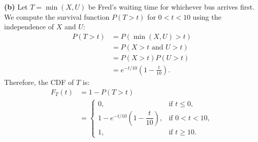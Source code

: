 \documentclass[11pt,a4paper]{article}
\begin{document}
\vspace{4pt}
\noindent \textbf{(b)} Let $T = \min(X, U)$ be Fred's waiting time for whichever bus arrives first. We compute the survival function $P(T > t)$ for $0 < t < 10$ using the independence of $X$ and $U$:
\begin{align*}
P(T > t) &= P(\min(X, U) > t) \\
&= P(X > t \text{ and } U > t) \\
&= P(X > t) P(U > t) \\
&= e^{-t/10} \left( 1 - \frac{t}{10} \right).
\end{align*}
Therefore, the CDF of $T$ is:
\begin{align*}
F_T(t) &= 1 - P(T > t) \\
&= \begin{cases}
0, & \text{if } t \le 0, \\[4pt]
1 - e^{-t/10} \left( 1 - \dfrac{t}{10} \right), & \text{if } 0 < t < 10, \\[8pt]
1, & \text{if } t \ge 10.
\end{cases}
\end{align*}
\end{document}
